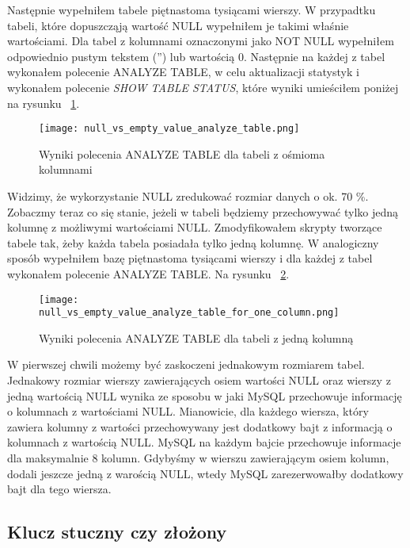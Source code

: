 Następnie wypełniłem tabele piętnastoma tysiącami wierszy. W przypadtku tabeli, które dopuszcząją wartość NULL wypełniłem je takimi właśnie wartościami. Dla tabel z kolumnami oznaczonymi jako NOT NULL wypełniłem odpowiednio pustym tekstem ('') lub wartością 0.
Następnie na każdej z tabel wykonałem polecenie ANALYZE TABLE, w celu aktualizacji statystyk i wykonałem polecenie \textit{SHOW TABLE STATUS}, które wyniki umieściłem poniżej na rysunku ~\ref{fig:null_vs_empty_value_analyze_table}.

\begin{figure}
	\caption{Wyniki polecenia ANALYZE TABLE dla tabeli z ośmioma kolumnami}
	\centering
	\texttt{[image: null\_vs\_empty\_value\_analyze\_table.png]}
	\label{fig:null_vs_empty_value_analyze_table}
\end{figure}

Widzimy, że wykorzystanie NULL zredukować rozmiar danych o ok. 70 \%. Zobaczmy teraz co się stanie, jeżeli w tabeli będziemy przechowywać tylko jedną kolumnę z możliwymi wartościami NULL. Zmodyfikowałem skrypty tworzące tabele tak, żeby każda tabela posiadała tylko jedną kolumnę. W analogiczny sposób wypełniłem bazę piętnastoma tysiącami wierszy i dla każdej z tabel wykonałem polecenie ANALYZE TABLE. Na rysunku ~\ref{fig:null_vs_empty_value_analyze_table_for_one_column}.

\begin{figure}
	\caption{Wyniki polecenia ANALYZE TABLE dla tabeli z jedną kolumną}
	\centering
	\texttt{[image: null\_vs\_empty\_value\_analyze\_table\_for\_one\_column.png]}
	\label{fig:null_vs_empty_value_analyze_table_for_one_column}
\end{figure}

W pierwszej chwili możemy być zaskoczeni jednakowym rozmiarem tabel. Jednakowy rozmiar wierszy zawierających osiem wartości NULL oraz wierszy z jedną wartością NULL wynika ze sposobu w jaki MySQL przechowuje informację o kolumnach z wartościami NULL. Mianowicie, dla każdego wiersza, który zawiera kolumny z wartości przechowywany jest dodatkowy bajt z informacją o kolumnach z wartością NULL. MySQL na każdym bajcie przechowuje informacje dla maksymalnie 8 kolumn. Gdybyśmy w wierszu zawierającym osiem kolumn, dodali jeszcze jedną z warością NULL, wtedy MySQL zarezerwowałby dodatkowy bajt dla tego wiersza.


\subsection{Klucz stuczny czy złożony}
